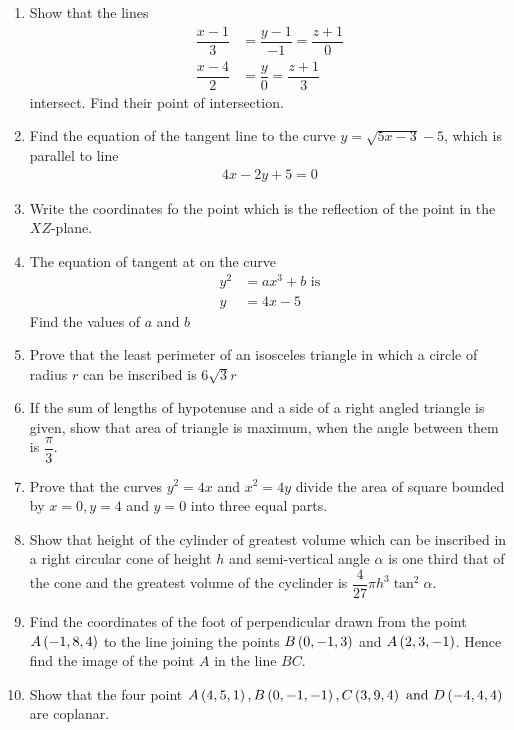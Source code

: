 \begin{enumerate}
    \item Show that the lines
          \begin{align*}
              \dfrac{x-1}{3} & = \dfrac{y-1}{-1} = \dfrac{z+1}{0} \\
              \dfrac{x-4}{2} & = \dfrac{y}{0} = \dfrac{z+1}{3}
          \end{align*}
          intersect. Find their point of intersection.
    \item Find the equation of the tangent line to the curve $y=\sqrt{5x-3} -5$, which is parallel to line
          \begin{align*}
              4x-2y+5=0
          \end{align*}
    \item Write the coordinates fo the point which is the reflection of the point \brak{\alpha,\beta,\gamma} in the $XZ$-plane.
    \item The equation of tangent at  on the curve
          \begin{align*}
              y^2 & = ax^3 + b \text { is} \\
              y   & = 4x -5
          \end{align*}
          Find the values of $a$ and $b$
    \item Prove that the least perimeter of an isosceles triangle in which a circle of radius $r$ can be inscribed is $6 \sqrt{3} r$
    \item If the sum of lengths of hypotenuse and a side of a right angled triangle is given, show that area of triangle is maximum, when the angle between them is $\dfrac{\pi}{3}$.
    \item Prove that the curves $y^2=4x$ and $x^2= 4y$ divide the area of square bounded by $x=0,y=4$ and $y=0$ into three equal parts.
    \item Show that height of the cylinder of greatest volume which can be inscribed in a right circular cone of height $h$ and semi-vertical angle $\alpha$ is one third that of the cone and the greatest volume of the cyclinder is $\dfrac{4}{27}\pi h^3\tan^2\alpha$.
    \item Find the coordinates of the foot of perpendicular drawn from the point $A\left(-1,8,4\right)$ to the line joining the points $B\left(0,-1,3\right)$ and $A\left(2,3,-1\right)$. Hence find the image of the point $A$ in the line $BC$.

\item Show that the four point $A\left(4, 5, 1\right), B\left(0,-1,-1\right), C\left(3,9,4\right) \text{ and } D\left(-4,4,4\right)$ are coplanar.

\end{enumerate}
